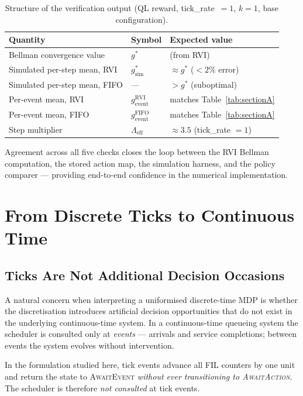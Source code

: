 \documentclass[11pt,a4paper]{article}
\begin{document}
\begin{table}[h]
\centering
\caption{Structure of the verification output (QL reward, tick\_rate~$=1$,
         $k=1$, base configuration).}
\label{tab:verification}
\begin{tabular}{lll}
\toprule
Quantity & Symbol & Expected value \\
\midrule
Bellman convergence value & $g^*$ & (from RVI) \\
Simulated per-step mean, RVI & $g^*_\text{sim}$ & $\approx g^*$ ($<2\%$ error) \\
Simulated per-step mean, FIFO & --- & $> g^*$ (suboptimal) \\
Per-event mean, RVI & $g_\text{event}^\text{RVI}$ & matches Table~\ref{tab:sectionA} \\
Per-event mean, FIFO & $g_\text{event}^\text{FIFO}$ & matches Table~\ref{tab:sectionA} \\
Step multiplier & $\Lambda_\text{eff}$ & $\approx 3.5$ (tick\_rate $=1$) \\
\bottomrule
\end{tabular}
\end{table}

Agreement across all five checks closes the loop between the RVI Bellman
computation, the stored action map, the simulation harness, and the policy
comparer --- providing end-to-end confidence in the numerical implementation.


\section{From Discrete Ticks to Continuous Time}
\label{sec:continuous}

\subsection{Ticks Are Not Additional Decision Occasions}

A natural concern when interpreting a uniformised discrete-time MDP is whether
the discretisation introduces artificial decision opportunities that do not exist
in the underlying continuous-time system.  In a continuous-time queueing system
the scheduler is consulted only at \emph{events} --- arrivals and service
completions; between events the system evolves without intervention.

In the formulation studied here, tick events advance all FIL counters by one
unit and return the state to \textsc{AwaitEvent} \emph{without ever transitioning
to \textsc{AwaitAction}}.  The scheduler is therefore \emph{not consulted} at
tick events.
\end{document}

